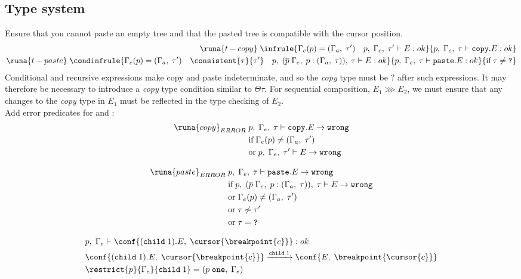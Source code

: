 \subsection{Type system}
Ensure that you cannot paste an empty tree and that the pasted tree is compatible with the cursor position.
\begin{align*}
    \runa{t-copy}\; \infrule{\Gamma_e(p)=(\Gamma_a,\; \tau')\quad p,\; \Gamma_e,\; \tau' \vdash E : ok}{p,\; \Gamma_e,\; \tau \vdash \texttt{copy}.E : ok}\\
    \runa{t-paste}\; \condinfrule{\Gamma_e(p)=(\Gamma_a,\; \tau')\quad \consistent{\tau}{\tau'}\quad p,\; (\overline{p}\; \Gamma_e,\; p : (\Gamma_a,\; \tau)),\; \tau \vdash E : ok}{p,\; \Gamma_e,\; \tau \vdash \texttt{paste}.E : ok}{\text{if}\; \tau \neq \texttt{?}}
\end{align*}
Conditional and recursive expressions make copy and paste indeterminate, and so the \textit{copy} type must be $\texttt{?}$ after such expressions. It may therefore be necessary to introduce a \textit{copy} type condition similar to $\Theta \tau$. For sequential composition, $E_1 \ggg E_2$, we must ensure that any changes to the \textit{copy} type in $E_1$ must be reflected in the type checking of $E_2$.\\

Add error predicates for  and :
\begin{align*}
    \runa{copy}_{ERROR} \; &p,\; \Gamma_e,\; \tau \vdash \texttt{copy}.E \rightarrow \texttt{wrong} \\
    &\text{if} \; \Gamma_e(p) \neq (\Gamma_a,\; \tau')\\
    &\text{or} \; p,\; \Gamma_e,\; \tau' \vdash E \rightarrow \texttt{wrong}
\end{align*}

\begin{align*}
    \runa{paste}_{ERROR}\; &p,\; \Gamma_e,\; \tau \vdash \texttt{paste}.E \rightarrow \texttt{wrong}\\
    &\text{if} \; p,\; (\overline{p}\; \Gamma_e,\; p : (\Gamma_a,\; \tau)),\; \tau \vdash E \rightarrow \texttt{wrong}\\
    &\text{or} \; \Gamma_e(p) \neq (\Gamma_a,\; \tau')\\
    &\text{or} \; \tau \not\sim \tau'\\
    &\text{or} \; \tau = \texttt{?}
\end{align*}


\begin{align*}
    &p,\; \Gamma_e \vdash \conf{(\texttt{child}\; 1).E,\; \cursor{\breakpoint{c}}} : ok\\
    &\conf{(\texttt{child}\; 1).E,\; \cursor{\breakpoint{c}}} \xrightarrow{\texttt{child}\; 1} \conf{E,\; \breakpoint{\cursor{c}}}\\
    &\restrict{p}{\Gamma_e}{\texttt{child}\; 1} = \left(p\; \texttt{one},\; \Gamma_e\right)
\end{align*}